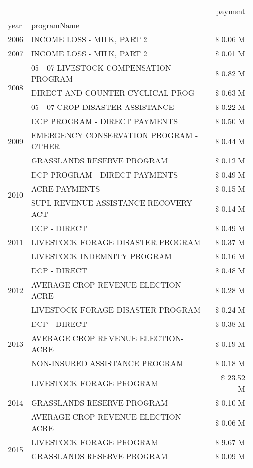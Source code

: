 \begin{tabular}{llr}
\toprule
 &  & payment \\
year & programName &  \\
\midrule
2006 & INCOME LOSS - MILK, PART 2 & \$ 0.06 M \\
\cline{1-3}
2007 & INCOME LOSS - MILK, PART 2 & \$ 0.01 M \\
\cline{1-3}
\multirow[t]{3}{*}{2008} & 05 - 07 LIVESTOCK COMPENSATION PROGRAM & \$ 0.82 M \\
 & DIRECT AND COUNTER CYCLICAL PROG & \$ 0.63 M \\
 & 05 - 07 CROP DISASTER ASSISTANCE & \$ 0.22 M \\
\cline{1-3}
\multirow[t]{3}{*}{2009} & DCP PROGRAM - DIRECT PAYMENTS & \$ 0.50 M \\
 & EMERGENCY CONSERVATION PROGRAM - OTHER & \$ 0.44 M \\
 & GRASSLANDS RESERVE PROGRAM & \$ 0.12 M \\
\cline{1-3}
\multirow[t]{3}{*}{2010} & DCP PROGRAM - DIRECT PAYMENTS & \$ 0.49 M \\
 & ACRE PAYMENTS & \$ 0.15 M \\
 & SUPL REVENUE ASSISTANCE RECOVERY ACT & \$ 0.14 M \\
\cline{1-3}
\multirow[t]{3}{*}{2011} & DCP - DIRECT & \$ 0.49 M \\
 & LIVESTOCK FORAGE DISASTER PROGRAM & \$ 0.37 M \\
 & LIVESTOCK INDEMNITY PROGRAM & \$ 0.16 M \\
\cline{1-3}
\multirow[t]{3}{*}{2012} & DCP - DIRECT & \$ 0.48 M \\
 & AVERAGE CROP REVENUE ELECTION-ACRE & \$ 0.28 M \\
 & LIVESTOCK FORAGE DISASTER PROGRAM & \$ 0.24 M \\
\cline{1-3}
\multirow[t]{3}{*}{2013} & DCP - DIRECT & \$ 0.38 M \\
 & AVERAGE CROP REVENUE ELECTION-ACRE & \$ 0.19 M \\
 & NON-INSURED ASSISTANCE PROGRAM & \$ 0.18 M \\
\cline{1-3}
\multirow[t]{3}{*}{2014} & LIVESTOCK FORAGE PROGRAM & \$ 23.52 M \\
 & GRASSLANDS RESERVE PROGRAM & \$ 0.10 M \\
 & AVERAGE CROP REVENUE ELECTION-ACRE & \$ 0.06 M \\
\cline{1-3}
\multirow[t]{3}{*}{2015} & LIVESTOCK FORAGE PROGRAM & \$ 9.67 M \\
 & GRASSLANDS RESERVE PROGRAM & \$ 0.09 M \\

\end{tabular}
